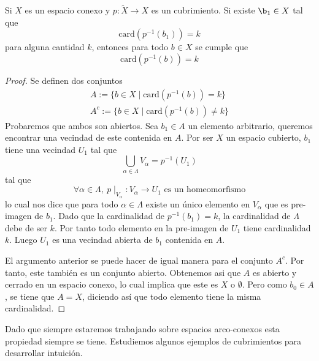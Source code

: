 \begin{teorema}
  Si \(X\) es un espacio conexo y \(p : \tilde X \to X\) es un
  cubrimiento. Si existe \(\b_1 \in X\) tal que
  \[ \text{card} \left( p^{-1} (b_1) \right) = k \]
  para alguna cantidad \(k\), entonces para todo \(b \in X\) se cumple
  que
  \[ \text{card} \left( p^{-1} (b) \right) = k \]
\end{teorema}
\begin{proof}
  Se definen dos conjuntos
  \begin{gather*}
    A := \{ b \in X \mid \text{card} \left( p^{-1} (b) \right) = k
      \} \\
    A^c := \{ b \in X \mid \text{card} \left( p^{-1} (b) \right) \neq
      k \}
  \end{gather*}
  Probaremos que ambos son abiertos. Sea \(b_1 \in A\) un elemento
  arbitrario, queremos encontrar una vecindad de este contenida en
  \(A\). Por ser \(X\) un espacio cubierto, \(b_1\) tiene una vecindad
  \(U_1\) tal que
  \[ \bigcup_{\alpha \in \Lambda} V_\alpha = p^{-1} (U_1) \]
  tal que
  \[\forall \alpha \in \Lambda, \ p \mid_{V_\alpha} : V_\alpha \to
    U_1 \text{ es un homeomorfismo} \]
  lo cual nos dice que para todo \(\alpha \in \Lambda\) existe un único
  elemento en \(V_\alpha\) que es pre-imagen de \(b_1\). Dado que la
  cardinalidad de \(p^{-1} (b_1) = k\), la cardinalidad de \(\Lambda\)
  debe de ser \(k\). Por tanto todo elemento en la pre-imagen de \(U_1\)
  tiene cardinalidad \(k\). Luego \(U_1\) es una vecindad abierta de
  \(b_1\) contenida en \(A\).

  El argumento anterior se puede hacer de igual manera para el conjunto
  \(A^c\). Por tanto, este también es un conjunto abierto. Obtenemos asi
  que \(A\) es abierto y cerrado en un espacio conexo, lo cual implica que
  este es \(X\) o \(\emptyset\). Pero como \(b_0 \in A\), se tiene que
  \(A = X\), diciendo así que todo elemento tiene la misma cardinalidad.
\end{proof}

Dado que siempre estaremos trabajando sobre espacios arco-conexos esta
propiedad siempre se tiene. Estudiemos algunos ejemplos de cubrimientos
para desarrollar intuición.

